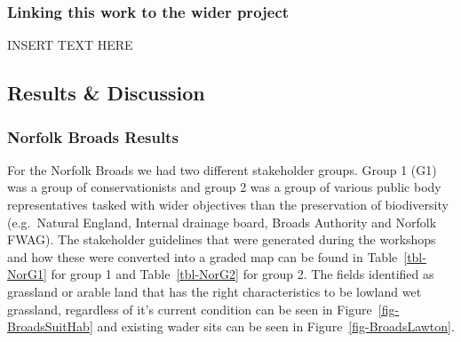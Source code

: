 \documentclass[
  12pt,
  letterpaper,
  DIV=11,
  numbers=noendperiod]{scrartcl}
\begin{document}
\subsubsection{Linking this work to the wider
project}\label{linking-this-work-to-the-wider-project}

INSERT TEXT HERE

\newpage{}

\subsection{Results \& Discussion}\label{results-discussion}

\subsubsection{Norfolk Broads Results}\label{norfolk-broads-results}

For the Norfolk Broads we had two different stakeholder groups. Group 1
(G1) was a group of conservationists and group 2 was a group of various
public body representatives tasked with wider objectives than the
preservation of biodiversity (e.g.~Natural England, Internal drainage
board, Broads Authority and Norfolk FWAG). The stakeholder guidelines
that were generated during the workshops and how these were converted
into a graded map can be found in Table~\ref{tbl-NorG1} for group 1 and
Table~\ref{tbl-NorG2} for group 2. The fields identified as grassland or
arable land that has the right characteristics to be lowland wet
grassland, regardless of it's current condition can be seen in
Figure~\ref{fig-BroadsSuitHab} and existing wader sits can be seen in
Figure~\ref{fig-BroadsLawton}.
\end{document}
